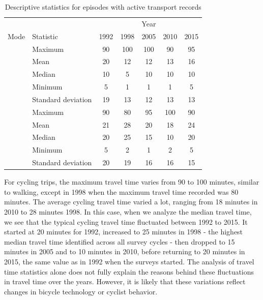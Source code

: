 \documentclass[preprint, 3p,
authoryear]{elsarticle} %
\begin{document}
\begingroup\fontsize{8}{10}\selectfont

\begin{longtable}[t]{>{}llccccc}
\caption{\label{tab:table-02}\label{tab:table-02}Descriptive statistics for episodes with active transport records}\\
\toprule
\multicolumn{2}{c}{ } & \multicolumn{5}{c}{Year} \\
\cmidrule(l{3pt}r{3pt}){3-7}
Mode & Statistic & 1992 & 1998 & 2005 & 2010 & 2015\\
\midrule
 & Maximum & 90 & 100 & 100 & 90 & 95\\
\nopagebreak
 & Mean & 20 & 12 & 12 & 13 & 16\\
\nopagebreak
 & Median & 10 & 5 & 10 & 10 & 10\\
\nopagebreak
 & Minimum & 5 & 1 & 1 & 1 & 5\\
\nopagebreak
\multirow[t]{-5}{*}{\raggedright\arraybackslash \textbf{Walking}} & Standard deviation & 19 & 13 & 12 & 13 & 13\\
\cmidrule{1-7}\pagebreak[0]
 & Maximum & 90 & 80 & 95 & 100 & 90\\
\nopagebreak
 & Mean & 21 & 28 & 20 & 18 & 24\\
\nopagebreak
 & Median & 20 & 25 & 15 & 10 & 20\\
\nopagebreak
 & Minimum & 5 & 2 & 1 & 2 & 5\\
\nopagebreak
\multirow[t]{-5}{*}{\raggedright\arraybackslash \textbf{Cycling}} & Standard deviation & 20 & 19 & 16 & 16 & 15\\
\bottomrule
\end{longtable}
\endgroup{}

For cycling trips, the maximum travel time varies from 90 to 100
minutes, similar to walking, except in 1998 when the maximum travel time
recorded was 80 minutes. The average cycling travel time varied a lot,
ranging from 18 minutes in 2010 to 28 minutes 1998. In this case, when
we analyze the median travel time, we see that the typical cycling
travel time fluctuated between 1992 to 2015. It started at 20 minutes
for 1992, increased to 25 minutes in 1998 - the highest median travel
time identified across all survey cycles - then dropped to 15 minutes in
2005 and to 10 minutes in 2010, before returning to 20 minutes in 2015,
the same value as in 1992 when the surveys started. The analysis of
travel time statistics alone does not fully explain the reasons behind
these fluctuations in travel time over the years. However, it is likely
that these variations reflect changes in bicycle technology or cyclist
behavior.
\end{document}

